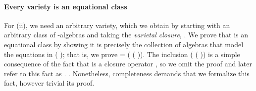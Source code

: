 \paragraph*{Every variety is an equational class}
For (ii), we need an arbitrary variety, which we obtain by starting with an arbitrary class
 of -algebras and taking the \emph{varietal closure},  .
We prove that   is an equational class by showing it is precisely the collection of
algebras that model the equations in  ( ); that is, we prove
  =  ( ( )).
The inclusion     ( ( )) is a simple
consequence of the fact that   is a closure operator%
\ifshort
, so we omit the proof and later refer to this fact as .
\else
. Nonetheless, completeness demands that we formalize this fact, however trivial its proof.


